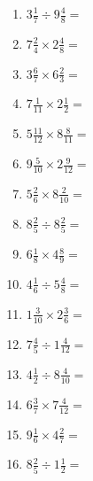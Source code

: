 \documentclass[12pt]{article}
\begin{document}
\begin{enumerate}
\item \large $ 3 \frac{1}{7} \div 9 \frac{4}{8} = $ \vspace{1.6cm}
\item \large $ 7 \frac{2}{4} \times 2 \frac{4}{8} = $ \vspace{1.6cm}
\item \large $ 3 \frac{6}{7} \times 6 \frac{2}{3} = $ \vspace{1.6cm}
\item \large $ 7 \frac{1}{11} \times 2 \frac{1}{2} = $ \vspace{1.6cm}
\item \large $ 5 \frac{11}{12} \times 8 \frac{8}{11} = $ \vspace{1.6cm}
\item \large $ 9 \frac{5}{10} \times 2 \frac{9}{12} = $ \vspace{1.6cm}
\newpage
\item \large $ 5 \frac{2}{6} \times 8 \frac{2}{10} = $ \vspace{1.6cm}
\item \large $ 8 \frac{2}{5} \div 8 \frac{2}{5} = $ \vspace{1.6cm}
\item \large $ 6 \frac{1}{8} \times 4 \frac{8}{9} = $ \vspace{1.6cm}
\item \large $ 4 \frac{1}{6} \div 5 \frac{4}{8} = $ \vspace{1.6cm}
\item \large $ 1 \frac{3}{10} \times 2 \frac{3}{6} = $ \vspace{1.6cm}
\item \large $ 7 \frac{4}{5} \div 1 \frac{4}{12} = $ \vspace{1.6cm}
\item \large $ 4 \frac{1}{2} \div 8 \frac{4}{10} = $ \vspace{1.6cm}
\item \large $ 6 \frac{3}{7} \times 7 \frac{4}{12} = $ \vspace{1.6cm}
\item \large $ 9 \frac{1}{6} \times 4 \frac{2}{7} = $ \vspace{1.6cm}
\item \large $ 8 \frac{2}{5} \div 1 \frac{1}{2} = $ \vspace{1.6cm}
\end{enumerate}
\newpage
\end{document}
